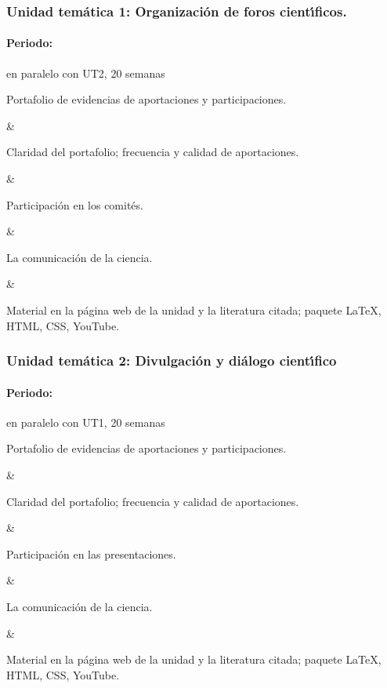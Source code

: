\subsubsection{Unidad tem\'{a}tica 1: Organizaci\'{o}n de foros cient\'{\i}ficos.}

\paragraph{Periodo:} en paralelo con UT2, 20 semanas



Portafolio de evidencias de aportaciones y participaciones.

&

Claridad del portafolio; frecuencia y calidad de aportaciones.

&

Participaci\'{o}n en los comit\'{e}s.

&

La comunicaci\'{o}n de la ciencia.

&

Material en la p\'{a}gina web de la unidad y la literatura citada;
paquete {\LaTeX}, HTML, CSS, YouTube.



\newpage

\subsubsection{Unidad tem\'{a}tica 2: Divulgaci\'{o}n y di\'{a}logo cient\'{\i}fico}

\paragraph{Periodo:} en paralelo con UT1, 20 semanas



Portafolio de evidencias de aportaciones y participaciones.

&

Claridad del portafolio; frecuencia y calidad de aportaciones.

&

Participaci\'{o}n en las presentaciones.

&

La comunicaci\'{o}n de la ciencia.

&

Material en la p\'{a}gina web de la unidad y la literatura citada;
paquete {\LaTeX}, HTML, CSS, YouTube.




